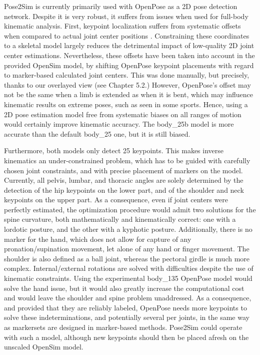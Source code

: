 Pose2Sim is currently primarily used with OpenPose as a 2D pose detection network. Despite it is very robust, it suffers from issues when used for full-body kinematic analysis. First, keypoint localization suffers from systematic offsets when compared to actual joint center positions \cite{Needham2021b}. Constraining these coordinates to a skeletal model largely reduces the detrimental impact of low-quality 2D joint center estimations. Nevertheless, these offsets have been taken into account in the provided OpenSim model, by shifting OpenPose keypoint placements with regard to marker-based calculated joint centers. This was done manually, but precisely, thanks to our overlayed view (see  Chapter 5.2.) However, OpenPose’s offset may not be the same when a limb is extended as when it is bent, which may influence kinematic results on extreme poses, such as seen in some sports. Hence, using a 2D pose estimation model free from systematic biases on all ranges of motion would certainly improve kinematic accuracy. The body\_25b model is more accurate than the default body\_25 one, but it is still biased. 

Furthermore, both models only detect 25 keypoints. This makes inverse kinematics an under-constrained problem, which has to be guided with carefully chosen joint constraints, and with precise placement of markers on the model. Currently, all pelvis, lumbar, and thoracic angles are solely determined by the detection of the hip keypoints on the lower part, and of the shoulder and neck keypoints on the upper part. As a consequence, even if joint centers were perfectly estimated, the optimization procedure would admit two solutions for the spine curvature, both mathematically and kinematically correct: one with a lordotic posture, and the other with a kyphotic posture. Additionally, there is no marker for the hand, which does not allow for capture of any pronation/supination movement, let alone of any hand or finger movement. The shoulder is also defined as a ball joint, whereas the pectoral girdle is much more complex. Internal/external rotations are solved with difficulties despite the use of kinematic constraints. Using the experimental body\_135 OpenPose model would solve the hand issue, but it would also greatly increase the computational cost and would leave the shoulder and spine problem unaddressed. As a consequence, and provided that they are reliably labeled, OpenPose needs more keypoints to solve these indeterminations, and potentially several per joints, in the same way as markersets are designed in marker-based methods. Pose2Sim could operate with such a model, although new keypoints should then be placed afresh on the unscaled OpenSim model. 

